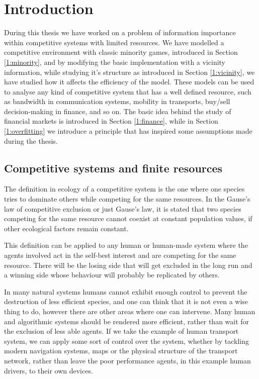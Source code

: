 \chapter{Introduction}

During this thesis we have worked on a problem of information importance within competitive systems with limited resources. 
We have modelled a competitive environment with classic minority games, introduced in Section \ref{1:minority}, and by modifying the basic implementation with a vicinity information, while studying it's structure as introduced in Section \ref{1:vicinity}, we have studied how it affects the efficiency of the model.
These models can be used to analyse any kind of competitive system that has a well defined resource, such as bandwidth in communication systems, mobility in transports, buy/sell decision-making in finance, and so on.
The basic idea behind the study of financial markets is introduced in Section \ref{1:finance}, while in Section \ref{1:overfitting} we introduce a principle that has inspired some assumptions made during the thesis.

\section{Competitive systems and finite resources}
\label{1:competitive}
The definition in ecology of a competitive system is the one where one species tries to dominate others while competing for the same resources. 
In the Gause's law of competitive exclusion or just Gause's law, \cite{gause1936struggle} it is stated that two species competing for the same resource cannot coexist at constant population values, if other ecological factors remain constant. 

This definition can be applied to any human or human-made system where the agents involved act in the self-best interest and are competing for the same resource.
There will be the losing side that will get excluded in the long run and a winning side whose behaviour will probably be replicated by others.

In many natural systems humans cannot exhibit enough control to prevent the destruction of less efficient species, and one can think that it is not even a wise thing to do, however there are other areas where one can intervene.
Many human and algorithmic systems should be rendered more efficient, rather than wait for the exclusion of less able agents.
If we take the example of human transport system, we can apply some sort of control over the system, whether by tackling modern navigation systems, maps or the physical structure of the transport network, rather than leave the poor performance agents, in this example human drivers, to their own devices.
	

